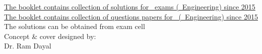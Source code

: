 \documentclass[a4paper,final,twoside,12pt]{book}
\begin{document}

\thispagestyle{empty} %
\vspace*{1.3\linewidth}
\begin{flushleft}
\ifsolution
	\underline{The booklet contains collection of solutions for \thesemester\ exams (\thedepartment\ Engineering) since 2015}\\\vspace {2mm}
\else
	\underline{The booklet contains collection of questions papers for \thesemester\ (\thedepartment\ Engineering) since 2015}\\\vspace {2mm}
	The solutions can be obtained from exam cell\\\vspace {2mm}
\fi
Concept \& cover designed by:\\\vspace {2mm}
Dr. Ram Dayal
\end{flushleft}
\pagestyle{plain}
\tableofcontents
\clearpage
\pagestyle{plain} %
\setcounter{page}{1}
\setlength{\parindent}{\pindt pt}
\newsavebox\mybox
\savebox{}
\newwatermark*[
  allpages,
  angle=45,
  scale=6,
  xpos=-20,
  ypos=15
]{\usebox\mybox}
\ifsolution
	
\else
	
\fi

\end{document}
